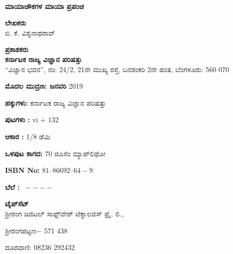 ~
\thispagestyle{empty}

\vfill

\begin{center}
{\Large\bfseries ಮಾಯಾಚೌಕಗಳ ಮಾಯಾ ಪ್ರಪಂಚ}\\

\smallskip
\smallskip
\smallskip

{\bfseries ಲೇಖಕರು}\\[0.1cm]
ಬಿ. ಕೆ. ವಿಶ್ವನಾಥರಾವ್\\


\vfill

\smallskip

{\bfseries ಪ್ರಕಾಶಕರು}\\[0.1cm]
{\large\bfseries ಕರ್ನಾಟಕ ರಾಜ್ಯ ವಿಜ್ಞಾನ ಪರಿಷತ್ತು}\\
“ವಿಜ್ಞಾನ ಭವನ”, ನಂ: {\rm 24/2}, {\rm 21}ನೇ ಮುಖ್ಯ ರಸ್ತೆ, ಬನಶಂಕರಿ {\rm 2}ನೇ ಹಂತ, ಬೆಂಗಳೂರು: {\rm 560 070}
\end{center}

\vfill

\begin{center}
{\bfseries ಮೊದಲ ಮುದ್ರಣ: ಜನವರಿ} {\rm 2019}

\vfill

{\bfseries ಹಕ್ಕುಗಳು:} ಕರ್ನಾಟಕ ರಾಜ್ಯ ವಿಜ್ಞಾನ ಪರಿಷತ್ತು 

\vfill

{\bfseries ಪುಟಗಳು :} vi + 132

\vfill

{\bfseries ಆಕಾರ : } {\rm 1/8 ಡೆಮಿ}

\vfill

{\bfseries ಒಳಪುಟ ಕಾಗದ:} {\rm 70} ಜಿಎಸೆಂ ಮ್ಯಾಪ್‌ಲಿಥೋ 

\vfill

 {\rm {\bfseries ISBN No:}} {\rm $81–86692–64-9$}

\vfill


{\bfseries ಬೆಲೆ :} \rupee \ {\rm $----$}

\vfill

{\bfseries ಟೈಪ್‌ಸೆಟ್}\\
 ಶ್ರೀರಂಗ ಡಿಜಿಟಲ್ ಸಾಫ್ಟ್‌ವೇರ್ ಟೆಕ್ನಾಲಜಿಸ್ ಪ್ರೈ. ಲಿ.,

ಶ್ರೀರಂಗಪಟ್ಟಣ$-$ {\rm 571 438}

\smallskip

ದೂರವಾಣಿ: {\rm 08236 292432}

\vfill

\end{center}
\newpage

